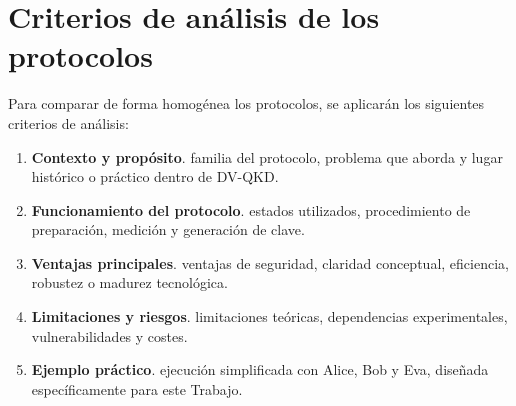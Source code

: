 \section{Criterios de análisis de los protocolos}

Para comparar de forma homogénea los protocolos, se aplicarán los siguientes criterios de análisis:

\begin{enumerate}
    \item \textbf{Contexto y propósito}. familia del protocolo, problema que aborda y lugar histórico o práctico dentro de DV-QKD.
    \item \textbf{Funcionamiento del protocolo}. estados utilizados, procedimiento de preparación, medición y generación de clave.
    \item \textbf{Ventajas principales}. ventajas de seguridad, claridad conceptual, eficiencia, robustez o madurez tecnológica.
    \item \textbf{Limitaciones y riesgos}. limitaciones teóricas, dependencias experimentales, vulnerabilidades y costes.
    \item \textbf{Ejemplo práctico}. ejecución simplificada con Alice, Bob y Eva, diseñada específicamente para este Trabajo.
\end{enumerate}
